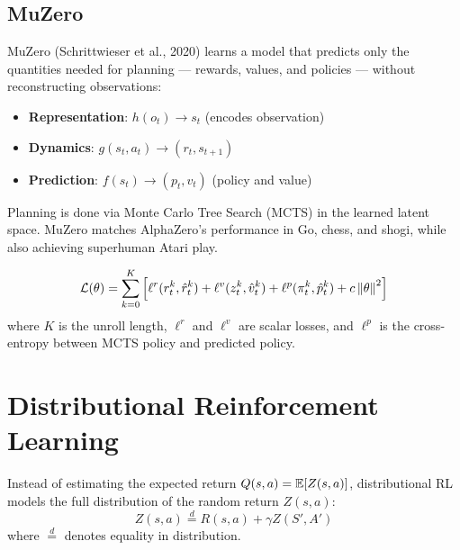 \subsection{MuZero}

\begin{definition}[MuZero]
MuZero (Schrittwieser et al., 2020) learns a model that predicts only
the quantities needed for planning --- rewards, values, and policies ---
without reconstructing observations:
\begin{itemize}
    \item \textbf{Representation}: $h(o_t) \to s_t$ (encodes observation)
    \item \textbf{Dynamics}: $g(s_t, a_t) \to (r_t, s_{t+1})$
    \item \textbf{Prediction}: $f(s_t) \to (p_t, v_t)$ (policy and value)
\end{itemize}
Planning is done via Monte Carlo Tree Search (MCTS) in the learned
latent space. MuZero matches AlphaZero's performance in Go, chess, and
shogi, while also achieving superhuman Atari play.
\end{definition}

\begin{keyformulas}[title=\textbf{MuZero Training Loss}]
\[
    \mathcal{L}(\theta) = \sum_{k=0}^{K} \left[
    \ell^r(r_t^k, \hat{r}_t^k) + \ell^v(z_t^k, \hat{v}_t^k)
    + \ell^p(\pi_t^k, \hat{p}_t^k) + c \left\| \theta \right\|^2
    \right]
\]
where $K$ is the unroll length, $\ell^r$ and $\ell^v$ are scalar losses,
and $\ell^p$ is the cross-entropy between MCTS policy and predicted policy.
\end{keyformulas}

\section{Distributional Reinforcement Learning}
\label{sec:distributional}

\begin{definition}[Distributional RL]
Instead of estimating the expected return $Q(s,a) = \mathbb{E}[Z(s,a)]$,
distributional RL models the full distribution of the random return
$Z(s,a)$:
\[
    Z(s,a) \stackrel{d}{=} R(s,a) + \gamma Z(S', A')
\]
where $\stackrel{d}{=}$ denotes equality in distribution.
\end{definition}

